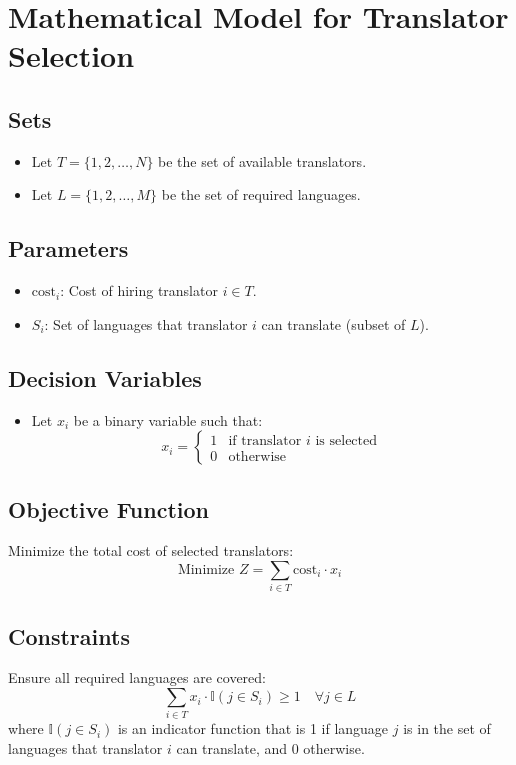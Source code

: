 \documentclass{article}
\begin{document}
\section*{Mathematical Model for Translator Selection}

\subsection*{Sets}
\begin{itemize}
    \item Let \( T = \{1, 2, \ldots, N\} \) be the set of available translators.
    \item Let \( L = \{1, 2, \ldots, M\} \) be the set of required languages.
\end{itemize}

\subsection*{Parameters}
\begin{itemize}
    \item \( \text{cost}_i \): Cost of hiring translator \( i \in T \).
    \item \( S_i \): Set of languages that translator \( i \) can translate (subset of \( L \)).
\end{itemize}

\subsection*{Decision Variables}
\begin{itemize}
    \item Let \( x_i \) be a binary variable such that:
    \[
    x_i = 
    \begin{cases} 
    1 & \text{if translator } i \text{ is selected} \\ 
    0 & \text{otherwise} 
    \end{cases}
    \]
\end{itemize}

\subsection*{Objective Function}
Minimize the total cost of selected translators:
\[
\text{Minimize } Z = \sum_{i \in T} \text{cost}_i \cdot x_i
\]

\subsection*{Constraints}
Ensure all required languages are covered:
\[
\sum_{i \in T} x_i \cdot \mathbb{I}(j \in S_i) \geq 1 \quad \forall j \in L
\]
where \( \mathbb{I}(j \in S_i) \) is an indicator function that is 1 if language \( j \) is in the set of languages that translator \( i \) can translate, and 0 otherwise.
\end{document}
